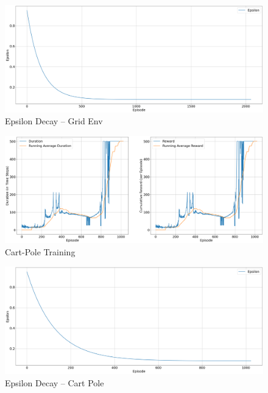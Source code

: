\documentclass{article} %
\begin{document}
\begin{figure}[H]
    \begin{center}
        \includegraphics[width=\textwidth]{eps_grid_ddqn.png}
    \end{center}
    \caption{Epsilon Decay -- Grid Env}
\end{figure}

\begin{figure}[H]
    \begin{center}
        \includegraphics[width=\textwidth]{cart_training.png}
    \end{center}
    \caption{Cart-Pole Training}
\end{figure}

\begin{figure}[H]
    \begin{center}
        \includegraphics[width=\textwidth]{eps_cart.png}
    \end{center}
    \caption{Epsilon Decay -- Cart Pole}
\end{figure}
\end{document}
